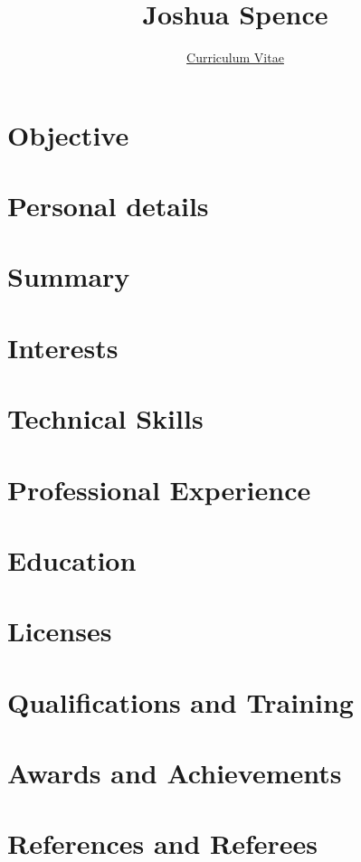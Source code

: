 \documentclass[10pt]{article}
\title{\Huge{\textbf{Joshua Spence}}}
\author{\Large{\underline{Curriculum Vitae}}}
\date{}
\begin{document}
\maketitle

\section*{Objective}


\section*{Personal details}


\section*{Summary}


\section*{Interests}


\section*{Technical Skills}


\section*{Professional Experience}


\section*{Education}


\section*{Licenses}


\section*{Qualifications and Training}


\section*{Awards and Achievements}


\section*{References and Referees}

\end{document}
